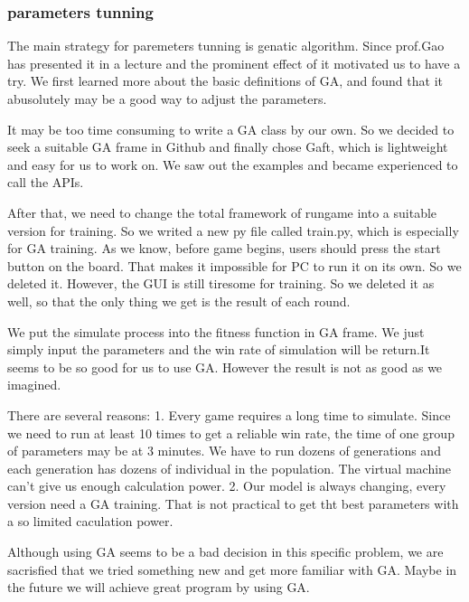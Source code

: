 \documentclass[aps,letterpaper,10pt]{revtex4}
\begin{document}
\subsubsection{parameters tunning}
The main strategy for paremeters tunning is genatic algorithm. Since prof.Gao has presented it in a lecture and the prominent effect of it motivated us to have a try.
We first learned more about the basic definitions of GA, and found that it abusolutely may be a good way to adjust the parameters.
\par
It may be too time consuming to write a GA class by our own. So we decided to seek a suitable GA frame in Github and finally chose Gaft, which is lightweight and easy for us to work on. We saw out the examples and became experienced to call the APIs.
\par
After that, we need to change the total framework of rungame into a suitable version for training. So we writed a new py file called train.py, which is especially for GA training. As we know, before game begins, users should press the start button on the board. That makes it impossible for PC to run it on its own. So we deleted it. However, the GUI is still tiresome for training. So we deleted it as well, so that the only thing we get is the result of each round.
\par
We put the simulate process into the fitness function in GA frame. We just simply input the parameters and the win rate of simulation will be return.It seems to be so good for us to use GA. However the result is not as good as we imagined.
\par
There are several reasons: 1. Every game requires a long time to simulate. Since we need to run at least 10 times to get a reliable win rate, the time of one group of parameters may be at 3 minutes. We have to run dozens of generations and each generation has dozens of individual in the population. The virtual machine can't give us enough calculation power. 2. Our model is always changing, every version need a GA training. That is not practical to get tht best parameters with a so limited caculation power.
\par
Although using GA seems to be a bad decision in this specific problem, we are sacrisfied that we tried something new and get more familiar with GA. Maybe in the future we will achieve great program by using GA.
\end{document}
